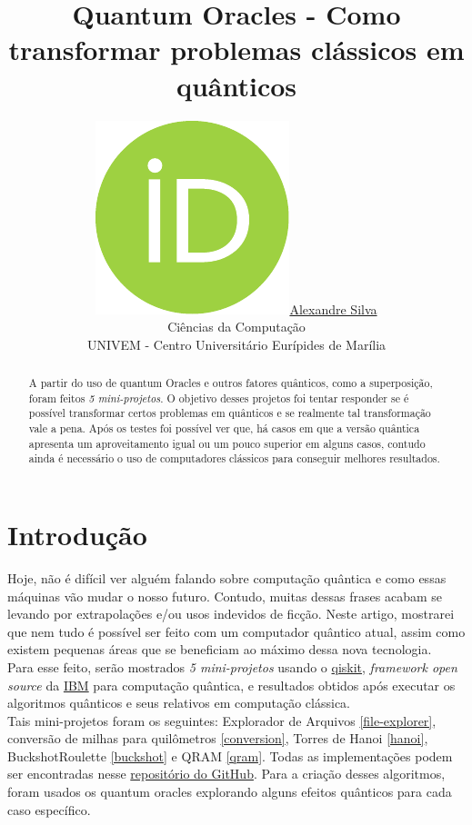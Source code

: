 \documentclass{article}
\title{Quantum Oracles - Como transformar problemas clássicos em quânticos}
\date{}
\author{ \href{https://orcid.org/0009-0008-9134-5974}{\includegraphics[scale=0.06]{orcid.pdf}\hspace{1mm}Alexandre Silva}\\
	Ciências da Computação\\
	UNIVEM - Centro Universitário Eurípides de Marília\\
}
\begin{document}
\maketitle
\begin{abstract}
	A partir do uso de quantum Oracles e outros fatores quânticos, como a superposição, foram feitos \emph{5 mini-projetos}. O objetivo desses projetos foi tentar responder se é possível transformar certos problemas em quânticos e se realmente tal transformação vale a pena. Após os testes foi possível ver que, há casos em que a versão quântica apresenta um aproveitamento igual ou um pouco superior em alguns casos, contudo ainda é necessário o uso de computadores clássicos para conseguir melhores resultados.
\end{abstract}


\section{Introdução}
Hoje, não é difícil ver alguém falando sobre computação quântica e como essas máquinas vão mudar o nosso futuro. Contudo, muitas dessas frases acabam se levando por extrapolações e/ou usos indevidos de ficção. Neste artigo, mostrarei que nem tudo é possível ser feito com um computador quântico atual, assim como existem pequenas áreas que se beneficiam ao máximo dessa nova tecnologia.\\
Para esse feito, serão mostrados \emph{5 mini-projetos} usando o \href{https://www.ibm.com/quantum/qiskit}{qiskit}, \emph{framework open source} da \href{https://www.ibm.com/}{IBM} para computação quântica, e resultados obtidos após executar os algoritmos quânticos e seus relativos em computação clássica.\\
Tais mini-projetos foram os seguintes: Explorador de Arquivos \ref{file-explorer}, conversão de milhas para quilômetros \ref{conversion}, Torres de Hanoi \ref{hanoi}, BuckshotRoulette \ref{buckshot} e QRAM \ref{qram}. Todas as implementações podem ser encontradas nesse  \href{https://github.com/Dpbm/scientific-initiation-1-quantum-oracles}{repositório do GitHub}.
Para a criação desses algoritmos, foram usados os quantum oracles explorando alguns efeitos quânticos para cada caso específico. 
\end{document}
